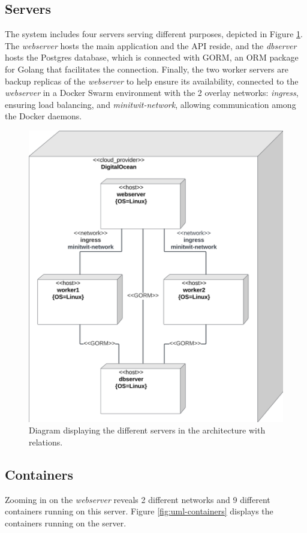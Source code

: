 \documentclass[12pt, a4paper, oneside]{book}
\begin{document}
\subsection{Servers}
The system includes four servers serving different purposes, depicted in Figure \ref{fig:uml-servers}.
The \textit{webserver} hosts the main application and the API reside, and the \textit{dbserver} hosts the Postgres database, which is connected with GORM, an ORM package for Golang that facilitates the connection.
Finally, the two worker servers are backup replicas of the \textit{webserver} to help ensure its availability, connected to the \textit{webserver} in a Docker Swarm environment with the 2 overlay networks: \textit{ingress}, ensuring load balancing, and \textit{minitwit-network}, allowing communication among the Docker daemons.

\begin{figure}[H]
    \centering
    \includegraphics[width=0.6\linewidth]{images/uml-component-servers.png}
    \caption{Diagram displaying the different servers in the architecture with relations.}
    \label{fig:uml-servers}
\end{figure}

\subsection{Containers}
Zooming in on the \textit{webserver} reveals 2 different networks and 9 different containers running on this server.
Figure \ref{fig:uml-containers} displays the containers running on the server.
\end{document}
